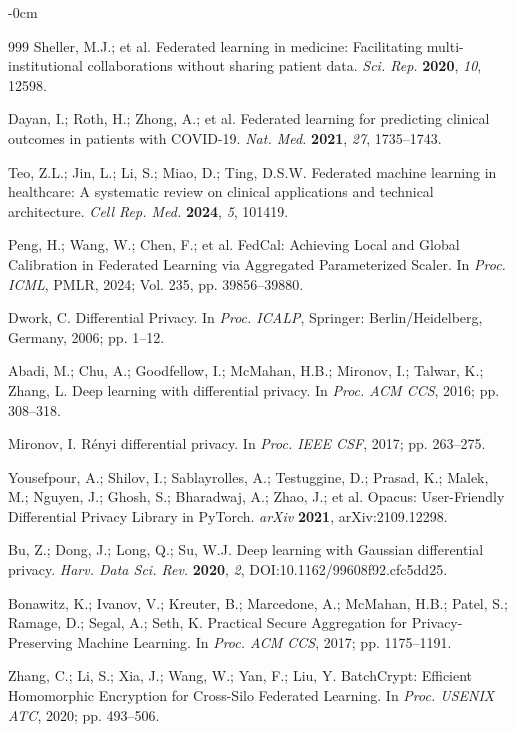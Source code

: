 \documentclass[journal,article,submit,pdftex,moreauthors]{Definitions/mdpi}
\begin{document}
\begin{adjustwidth}{-\extralength}{0cm}
\begin{thebibliography}{999}
Sheller, M.J.; et al. Federated learning in medicine: Facilitating multi-institutional collaborations without sharing patient data. \textit{Sci. Rep.} \textbf{2020}, \textit{10}, 12598.

Dayan, I.; Roth, H.; Zhong, A.; et al. Federated learning for predicting clinical outcomes in patients with COVID-19. \textit{Nat. Med.} \textbf{2021}, \textit{27}, 1735--1743.

Teo, Z.L.; Jin, L.; Li, S.; Miao, D.; Ting, D.S.W. Federated machine learning in healthcare: A systematic review on clinical applications and technical architecture. \textit{Cell Rep. Med.} \textbf{2024}, \textit{5}, 101419.

Peng, H.; Wang, W.; Chen, F.; et al. FedCal: Achieving Local and Global Calibration in Federated Learning via Aggregated Parameterized Scaler. In \textit{Proc. ICML}, PMLR, 2024; Vol. 235, pp. 39856--39880.

Dwork, C. Differential Privacy. In \textit{Proc. ICALP}, Springer: Berlin/Heidelberg, Germany, 2006; pp. 1--12.

Abadi, M.; Chu, A.; Goodfellow, I.; McMahan, H.B.; Mironov, I.; Talwar, K.; Zhang, L. Deep learning with differential privacy. In \textit{Proc. ACM CCS}, 2016; pp. 308--318.

Mironov, I. R\'enyi differential privacy. In \textit{Proc. IEEE CSF}, 2017; pp. 263--275.

Yousefpour, A.; Shilov, I.; Sablayrolles, A.; Testuggine, D.; Prasad, K.; Malek, M.; Nguyen, J.; Ghosh, S.; Bharadwaj, A.; Zhao, J.; et al. Opacus: User-Friendly Differential Privacy Library in PyTorch. \textit{arXiv} \textbf{2021}, arXiv:2109.12298.

Bu, Z.; Dong, J.; Long, Q.; Su, W.J. Deep learning with Gaussian differential privacy. \textit{Harv. Data Sci. Rev.} \textbf{2020}, \textit{2}, DOI:10.1162/99608f92.cfc5dd25.

Bonawitz, K.; Ivanov, V.; Kreuter, B.; Marcedone, A.; McMahan, H.B.; Patel, S.; Ramage, D.; Segal, A.; Seth, K. Practical Secure Aggregation for Privacy-Preserving Machine Learning. In \textit{Proc. ACM CCS}, 2017; pp. 1175--1191.

Zhang, C.; Li, S.; Xia, J.; Wang, W.; Yan, F.; Liu, Y. BatchCrypt: Efficient Homomorphic Encryption for Cross-Silo Federated Learning. In \textit{Proc. USENIX ATC}, 2020; pp. 493--506.


\end{thebibliography}
\end{adjustwidth}
\end{document}
